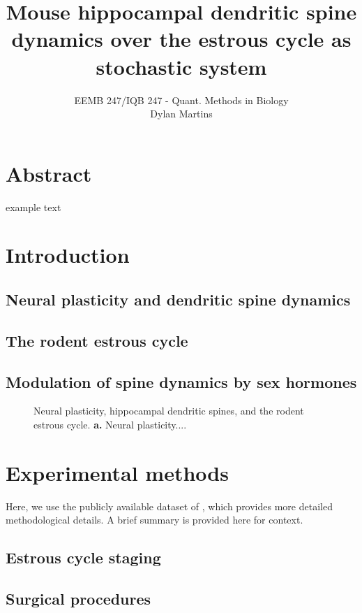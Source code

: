 \documentclass[11pt,letterpaper, onecolumn]{exam}
\begin{document}
\title{\textbf{Mouse hippocampal dendritic spine dynamics over the estrous cycle as stochastic system}}
\author{EEMB 247/IQB 247 - Quant. Methods in Biology\\Dylan Martins}
\date{}

\maketitle

\section*{Abstract}
example text

\section{Introduction} %
\subsection{Neural plasticity and dendritic spine dynamics}
\subsection{The rodent estrous cycle}
\subsection{Modulation of spine dynamics by sex hormones}

\begin{figure}[h]
    \centering
    \caption{Neural plasticity, hippocampal dendritic spines, and the rodent estrous cycle. \textbf{a.} Neural plasticity....}
    \label{fig:intro}
\end{figure}

\section{Experimental methods}
Here, we use the publicly available dataset of \cite{nora}, which provides more detailed methodological details. A brief summary is provided here for context.
\subsection{Estrous cycle staging}
\subsection{Surgical procedures}
\end{document}
